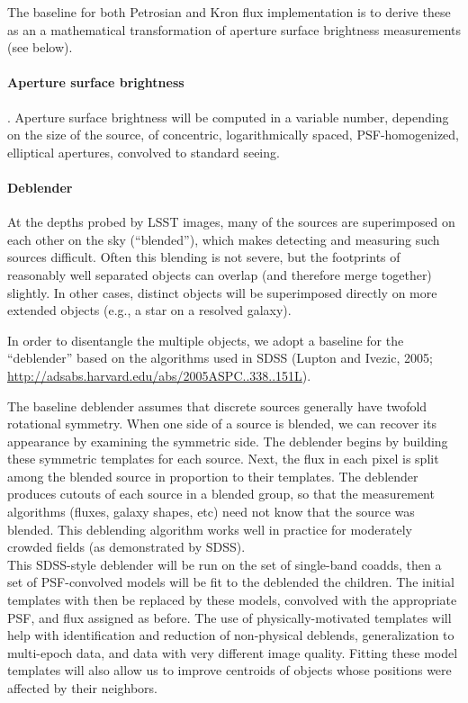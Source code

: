 \documentclass[12pt]{article}
\begin{document}
The baseline for both Petrosian and Kron flux implementation is to derive these as an a mathematical transformation of aperture surface brightness measurements (see below).

\paragraph{Aperture surface brightness}. Aperture surface brightness will be computed in a variable number, depending on the size of the source, of concentric, logarithmically spaced, PSF-homogenized, elliptical apertures, convolved to standard seeing.

\paragraph{Deblender}
\label{alg:deblender}

At the depths probed by LSST images, many of the sources are superimposed on each other on the sky (``blended''), which makes detecting and measuring such sources difficult.  Often this blending is not severe, but the footprints of reasonably well separated objects can overlap (and therefore merge together) slightly.  In other cases, distinct objects will be superimposed directly on more extended objects (e.g., a star on a resolved galaxy). %

In order to disentangle the multiple objects, we adopt a baseline for the ``deblender'' based on the algorithms used in SDSS (Lupton and Ivezic, 2005; \url{http://adsabs.harvard.edu/abs/2005ASPC..338..151L}).

The baseline deblender assumes that discrete sources generally have twofold
rotational symmetry.  When one side of a source is blended, we can
recover its appearance by examining the symmetric side.  The deblender
begins by building these symmetric templates for each source.  Next,
the flux in each pixel is split among the blended source in proportion
to their templates.  The deblender produces cutouts of each
source in a blended group, so that the measurement algorithms (fluxes,
galaxy shapes, etc) need not know that the source was blended. This deblending algorithm works well in practice for moderately crowded fields (as demonstrated by SDSS).
\\

This SDSS-style deblender will be run on the set of single-band coadds, then a set of PSF-convolved models will be fit to the deblended the children. The initial templates with then be replaced by these models, convolved with the appropriate PSF, and flux assigned as before. The use of physically-motivated templates will help with identification and reduction of non-physical deblends, generalization to multi-epoch data, and data with very different image quality.  Fitting these model templates will also allow us to improve centroids of objects whose positions were affected by their neighbors. %
\\
\end{document}
